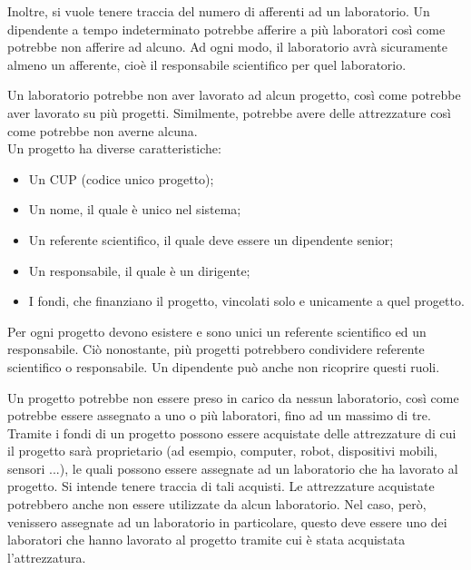         Inoltre, si vuole tenere traccia del numero di afferenti ad un laboratorio. Un dipendente a tempo indeterminato potrebbe afferire a più laboratori così come potrebbe non afferire ad alcuno. 
        Ad ogni modo, il laboratorio avrà sicuramente almeno un afferente, cioè il responsabile scientifico per quel laboratorio.
        
        Un laboratorio potrebbe non aver lavorato ad alcun progetto, così come potrebbe aver lavorato su più progetti. Similmente, potrebbe avere delle attrezzature così come potrebbe non averne alcuna.\\

        \noindent Un progetto ha diverse caratteristiche:
        \begin{itemize}
            \item Un CUP (codice unico progetto);
            \item Un nome, il quale è unico nel sistema;
            \item Un referente scientifico, il quale deve essere un dipendente senior;
            \item Un responsabile, il quale è un dirigente;
            \item I fondi, che finanziano il progetto, vincolati solo e unicamente a quel progetto.
        \end{itemize}
        
        Per ogni progetto devono esistere e sono unici un referente scientifico ed un responsabile. Ciò nonostante, più progetti potrebbero condividere referente scientifico o responsabile. Un dipendente può anche non ricoprire questi ruoli.
        
        Un progetto potrebbe non essere preso in carico da nessun laboratorio, così come potrebbe essere assegnato a uno o più laboratori, fino ad un massimo di tre.\\
        
        Tramite i fondi di un progetto possono essere acquistate delle attrezzature di cui il progetto sarà proprietario (ad esempio, computer, robot, dispositivi mobili, sensori ...), le quali possono essere assegnate ad un laboratorio che ha lavorato al progetto. Si intende tenere traccia di tali acquisti. Le attrezzature acquistate potrebbero anche non essere utilizzate da alcun laboratorio. Nel caso, però, venissero assegnate ad un laboratorio in particolare, questo deve essere uno dei laboratori che hanno lavorato al progetto tramite cui è stata acquistata l'attrezzatura.
        
